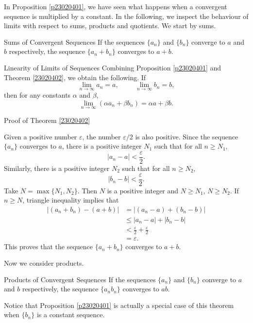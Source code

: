 In Proposition \ref{p23020401}, we have seen what happens when   a convergent sequence is multiplied by a constant. In the following, we   inspect the behaviour of limits with respect to sums, products and quotients.
We start by sums.
\begin{theorem}[label=23020402]{Sums of Convergent Sequences}
If the sequences $\{a_n\}$ and $\{b_n\}$ converge to $a$ and $b$ respectively, the sequence $\{a_n+b_n\}$ converges to $a+b$. 
\end{theorem}
\begin{highlight}{Linearity of Limits of Sequences}
 Combining Proposition \ref{p23020401} and Theorem \ref{23020402}, we obtain  the following. If
\[\lim_{n\rightarrow \infty}a_n=a,\hspace{1cm}\lim_{n\rightarrow\infty}b_n=b,\]then for any constants $\alpha$ and $\beta$,
\[\lim_{n\rightarrow\infty}\left(\alpha a_n+\beta b_n\right)=\alpha a+\beta b.\]  

 \end{highlight}
\begin{myproof}{\linkt Proof of Theorem \ref{23020402}\linko}
 
Given a positive number $\varepsilon$, the number $\varepsilon/2$ is also positive. Since the sequence $\{a_n\}$ converges to $a$, there is a positive integer $N_1$ such that for all $n\geq N_1$,
\[|a_n-a|<\frac{\varepsilon}{2}.\]
Similarly, 
 there is a positive integer $N_2$ such that for all $n\geq N_2$,
\[|b_n-b|<\frac{\varepsilon}{2}.\]
Take $N=\max\{N_1, N_2\}$. Then $N$ is a positive integer and $N\geq N_1$, $N\geq N_2$. If $n\geq N$, triangle inequality implies that
\begin{align*}
\left|(a_n+b_n)-(a+b)\right|&=|(a_n-a)+(b_n-b)|\\
&\leq |a_n-a|+|b_n-b|\\
&<\frac{\varepsilon}{2}+\frac{\varepsilon}{2}\\
&=\varepsilon.
\end{align*}This proves that the sequence $\{a_n+b_n\}$ converges to $a+b$.
\end{myproof}
 

Now we consider products.
\begin{theorem}[label=23020403]{Products of Convergent Sequences}
If the sequences $\{a_n\}$ and $\{b_n\}$ converge to $a$ and $b$ respectively, the sequence $\{a_nb_n\}$ converges to $ab$. 
\end{theorem}

Notice that  Proposition \ref{p23020401} is actually a special case of this theorem when $\{b_n\}$ is a constant sequence.


